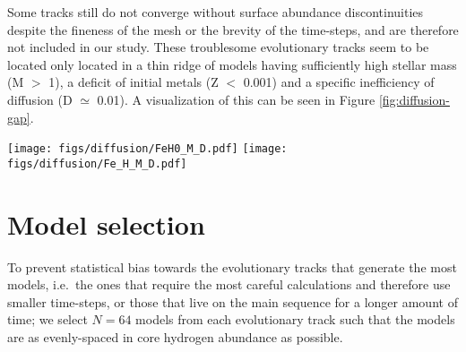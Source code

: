 \documentclass[twocolumn,twocolappendix]{aastex6}
\begin{document}
Some tracks still do not converge without surface abundance discontinuities despite the fineness of the mesh or the brevity of the time-steps, and are therefore not included in our study. These troublesome evolutionary tracks seem to be located only located in a thin ridge of models having sufficiently high stellar mass (M $>$ 1), a deficit of initial metals (Z $<$ 0.001) and a specific inefficiency of diffusion (D $\simeq$ 0.01). A visualization of this can be seen in Figure \ref{fig:diffusion-gap}.

\begin{figure*}
    \centering
    \texttt{[image: figs/diffusion/FeH0\_M\_D.pdf]}\hfill
    \texttt{[image: figs/diffusion/Fe\_H\_M\_D.pdf]}
    \caption{Stellar mass as a function of diffusion factor colored by initial surface metallicity (left) and final surface metallicity (right). A ridge of unconverged evolutionary tracks can be seen around a diffusion factor of 0.01. Beyond this ridge, tracks that were initially metal-poor end their main-sequence lives with all of their metals drained from their surfaces. \label{fig:diffusion-gap} }
\end{figure*}


\section{Model selection}
\label{sec:selection}
To prevent statistical bias towards the evolutionary tracks that generate the most models, i.e.\ the ones that require the most careful calculations and therefore use smaller time-steps, or those that live on the main sequence for a longer amount of time; we select $N=64$ models from each evolutionary track such that the models are as evenly-spaced in core hydrogen abundance as possible. 
\end{document}

